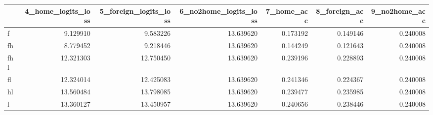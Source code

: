 \begin{tabular}{lrrrrrr}
\toprule
 & 4_home_logits_loss & 5_foreign_logits_loss & 6_no2home_logits_loss & 7_home_acc & 8_foreign_acc & 9_no2home_acc \\
\midrule
f & 9.129910 & 9.583226 & 13.639620 & 0.173192 & 0.149146 & 0.240008 \\
fh & 8.779452 & 9.218446 & 13.639620 & 0.144249 & 0.121643 & 0.240008 \\
fhl & 12.321303 & 12.750450 & 13.639620 & 0.239196 & 0.228893 & 0.240008 \\
fl & 12.324014 & 12.425083 & 13.639620 & 0.241346 & 0.224367 & 0.240008 \\
hl & 13.560484 & 13.798085 & 13.639620 & 0.239477 & 0.235985 & 0.240008 \\
l & 13.360127 & 13.450957 & 13.639620 & 0.240656 & 0.238446 & 0.240008 \\
\bottomrule
\end{tabular}
